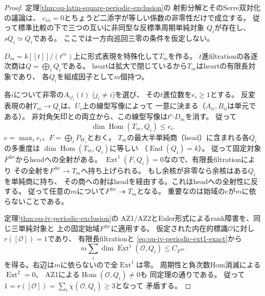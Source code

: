 \begin{proof}
定理\ref{thm:ou-latin-square-periodic-exclusion}の
射影分解とそのSerre双対化の議論は、
$c_{iii}=0$とちょうど二添字が等しい係数の非零性だけで成立する。
従って標準比較の下で三つの互いに非同型な反標準周期単純対象
$Q_i$が存在し、$sQ_i\simeq Q_i$である。
ここでは一方向巡回三零の条件を仮定しない。

$D_m=k[[t]]/(t^m)$上に形式表現を特殊化して$T_m$を作る。
$t$進filtrationの各逐次商は$Q=\bigoplus_iQ_i$である。
heartは拡大で閉じているから$T_m$はheartの有限長対象であり、
各$Q_i$を組成因子として$m$個持つ。

各$i$について非零の$A_{ij_i}(t)$ ($j_i\ne i$)を選び、
その$t$進位数を$e_i\geq1$とする。
反変表現の射$T_m\to Q_i$は、$U_i$上の線型写像によって
一意に決まる（$A_{ii},B_{ii}$は単元である）。
非対角矢印との両立から、この線型写像は$t^{e_i}D_m$を消す。
従って
\[
 \dim\operatorname{Hom}(T_m,Q_i)\leq e_i .
\]
$e=\max_i e_i$、$F=\bigoplus_i P_{W_i}$とおく。
$T_m$の最大半単純商（head）に含まれる各$Q_i$の多重度は
$\dim\operatorname{Hom}(T_m,Q_i)$に等しい
（$\operatorname{End}(Q_i)=k$）。
従って固定対象$F^{\oplus e}$からheadへの全射がある。
$\operatorname{Ext}^1(F,Q_i)=0$なので、有限長filtrationにより
その全射を$F^{\oplus e}\to T_m$へ持ち上げられる。
もし余核が非零なら余核はある$Q_i$を単純商に持ち、
その商への射はheadを経由する。これはheadへの全射性に反する。
従って任意の$m$について$F^{\oplus e}\twoheadrightarrow T_m$となる。
重要なのは始域の$e$が$m$に依らないことである。

定理\ref{thm:ou-iv-periodic-exclusion}の
AZ1/AZ2とEuler形式によるrank障害を、同じ三単純対象と
上の固定始域$F^{\oplus e}$に適用する。
仮定された内在的標識$\mathcal O$に対し$r([\mathcal O])=1$であり、
有限長filtrationと
\eqref{eq:ou-iv-periodic-ext1-exact}から
\[
 m\sum_i\dim\operatorname{Ext}^1(\mathcal O,Q_i)
 \leq C_{F^{\oplus e}}
\]
を得る。右辺は$m$に依らないので全$\operatorname{Ext}^1$は零。
周期性と負次数Hom消滅による$\operatorname{Ext}^2=0$、
AZ1による$\operatorname{Hom}(\mathcal O,Q_i)\ne0$も
同定理の通りである。
従って$1=r([\mathcal O])=\sum_i\chi(\mathcal O,Q_i)\geq3$となって
矛盾する。
\end{proof}

